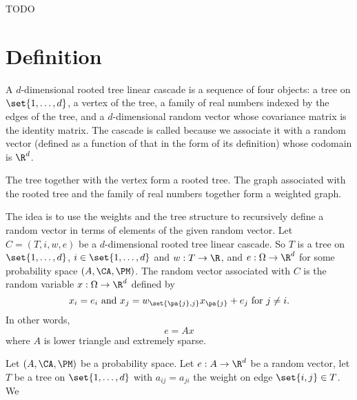 

TODO

\section{Definition}

A \t{$d$-dimensional rooted tree linear cascade} is a sequence of four objects: a tree on $\set{1, \dots, d}$, a vertex of the tree, a family of real numbers indexed by the edges of the tree, and a $d$-dimensional random vector whose covariance matrix is the identity matrix.
The cascade is called  because we associate it with a random vector (defined as a function of that in the form of its definition) whose codomain is  $\R^d$.

The tree together with the vertex form a rooted tree.
The graph associated with the rooted tree and the family of real numbers together form a weighted graph.

The idea is to use the weights and the tree structure to recursively define a random vector in terms of elements of the given random vector.
Let $C = (T, i, w, e)$ be a $d$-dimensional rooted tree linear cascade.
So $T$ is a tree on $\set{1, \dots, d}$, $i \in \set{1, \dots, d}$ and $w: T \to \R$, and $e: \Omega \to \R^d$ for some probability space $(A, \CA, \PM)$.
The random vector associated with $C$ is the random variable $x: \Omega \to \R^d$ defined by
$$
  x_i = e_i \text{ and } x_j = w_{\set{\pa{j}, j}}x_{\pa{j}} + e_{j} \text{ for } j \neq i.
$$
In other words,
$$
  e = Ax
$$
where $A$ is lower triangle and extremely sparse.


Let $(A, \CA, \PM)$ be a probability space.
Let $e: A \to \R^d$ be a random vector, let $T$ be a tree on $\set{1, \dots, d}$ with $a_{ij} = a_{ji}$ the weight on edge $\set{i, j} \in T$.
We


